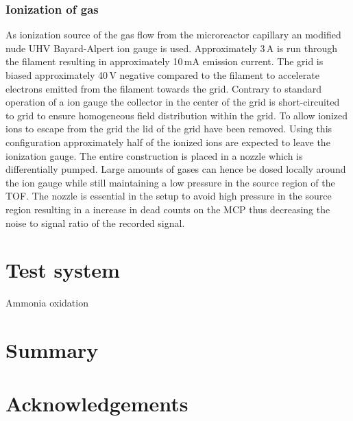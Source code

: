 \documentclass[aip,rsi]{revtex4-1}
\begin{document}
\subsubsection{Ionization of gas}
As ionization source of the gas flow from the microreactor capillary an modified nude UHV Bayard-Alpert ion gauge is used. Approximately 3\,A is run through the filament resulting in approximately 10\,mA emission current. The grid is biased approximately 40\,V negative compared to the filament to accelerate electrons emitted from the filament towards the grid. Contrary to standard operation of a ion gauge the collector in the center of the grid is short-circuited to grid to ensure homogeneous field distribution within the grid. To allow ionized ions to escape from the grid the lid of the grid have been removed. Using this configuration approximately half of the ionized ions are expected to leave the ionization gauge. The entire construction is placed in a nozzle which is differentially pumped. Large amounts of gases can hence be dosed locally around the ion gauge while still maintaining a low pressure in the source region of the TOF. The nozzle is essential in the setup to avoid high pressure in the source region resulting in a increase in dead counts on the MCP thus decreasing the noise to signal ratio of the recorded signal.

\section{Test system}
Ammonia oxidation

\section{Summary}

\section{Acknowledgements}


%
%
\end{document}
